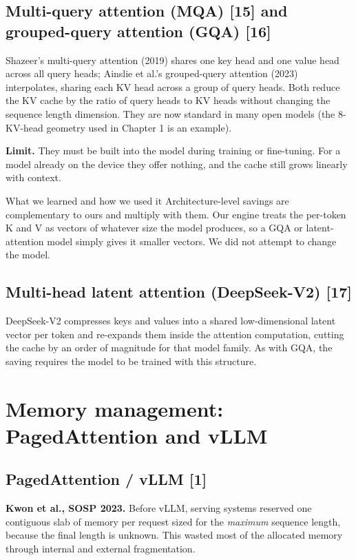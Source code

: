 \documentclass[12pt,a4paper]{report}
\begin{document}
\subsection{Multi-query attention (MQA) [15] and grouped-query attention (GQA) [16]}
Shazeer's multi-query attention (2019) shares one key head and one value head across all query heads; Ainslie et al.'s grouped-query attention (2023) interpolates, sharing each KV head across a group of query heads. Both reduce the KV cache by the ratio of query heads to KV heads without changing the sequence length dimension. They are now standard in many open models (the 8-KV-head geometry used in Chapter 1 is an example).

\textbf{Limit.} They must be built into the model during training or fine-tuning. For a model already on the device they offer nothing, and the cache still grows linearly with context.

\begin{calloutbox}{What we learned and how we used it}
Architecture-level savings are complementary to ours and multiply with them. Our engine treats the per-token K and V as vectors of whatever size the model produces, so a GQA or latent-attention model simply gives it smaller vectors. We did not attempt to change the model.

\end{calloutbox}
\subsection{Multi-head latent attention (DeepSeek-V2) [17]}
DeepSeek-V2 compresses keys and values into a shared low-dimensional latent vector per token and re-expands them inside the attention computation, cutting the cache by an order of magnitude for that model family. As with GQA, the saving requires the model to be trained with this structure.

\section{Memory management: PagedAttention and vLLM}\label{sec:2_3}
\subsection{PagedAttention / vLLM [1]}
\textbf{Kwon et al., SOSP 2023.} Before vLLM, serving systems reserved one contiguous slab of memory per request sized for the \textit{maximum} sequence length, because the final length is unknown. This wasted most of the allocated memory through internal and external fragmentation.
\end{document}
